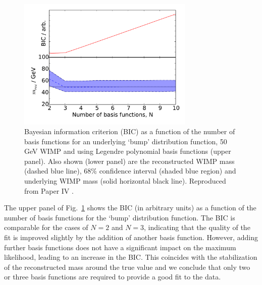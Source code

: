 \begin{figure}[t!]
\centering
  \includegraphics[width=0.75\textwidth]{Poly/VaryingN_BUMP_LEG.pdf}
  \caption[Bayesian information criterion and reconstructed WIMP mass as a function of the number of basis functions for a 50 GeV WIMP with `bump' distribution function]{Bayesian information criterion (BIC) as a function of the number of basis functions for an underlying `bump' distribution function, 50 GeV WIMP and using Legendre polynomial basis functions (upper panel). Also shown (lower panel) are the reconstructed WIMP mass (dashed blue line), 68\% confidence interval (shaded blue region) and underlying WIMP mass (solid horizontal black line). Reproduced from Paper IV \cite{Kavanagh:2014}.}
  \label{fig:Poly:BUMP_LEG}
\end{figure}

The upper panel of Fig.~\ref{fig:Poly:BUMP_LEG} shows the BIC (in arbitrary units) as a function of the number of basis functions for the `bump' distribution function. The BIC is comparable for the cases of $N=2$ and $N=3$, indicating that the quality of the fit is improved slightly by the addition of another basis function. However, adding further basis functions does not have a significant impact on the maximum likelihood, leading to an increase in the BIC. This coincides with the stabilization of the reconstructed mass around the true value and we conclude that only two or three basis functions are required to provide a good fit to the data.

